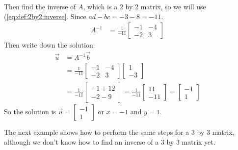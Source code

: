 \begin{example}
Then find the inverse of $A$, which is a 2 by 2 matrix, so we will use (\ref{eq:def:2by2:inverse}.    Since
 $ad-bc = -3 -8 = -11$.
\begin{align*}
A^{-1} & = \frac{1}{-11}
\begin{bmatrix}
-1 & -4 \\ -2 & 3
\end{bmatrix}
\end{align*}
Then write down the solution:
\begin{align*}
\vec{u} & = A^{-1} \vec{b} \\
& = \frac{1}{-11}
\begin{bmatrix}
-1 & -4 \\ -2 & 3
\end{bmatrix}
\begin{bmatrix}
1 \\ -3
\end{bmatrix}
\\
& = \frac{1}{-11} \begin{bmatrix}
-1+12 \\ -2-9
\end{bmatrix} = \frac{1}{-11} \begin{bmatrix}
11 \\ -11
\end{bmatrix} =
\begin{bmatrix}
	-1 \\ 1
\end{bmatrix}
\end{align*}
So the solution is $\vec{u} =
\begin{bmatrix}
	-1 \\ 1
\end{bmatrix}$ or $x=-1$ and $y=1$.
\end{example}

The next example shows how to perform the same steps for a 3 by 3 matrix, although we don't know how to find an inverse of a 3 by 3 matrix yet.

